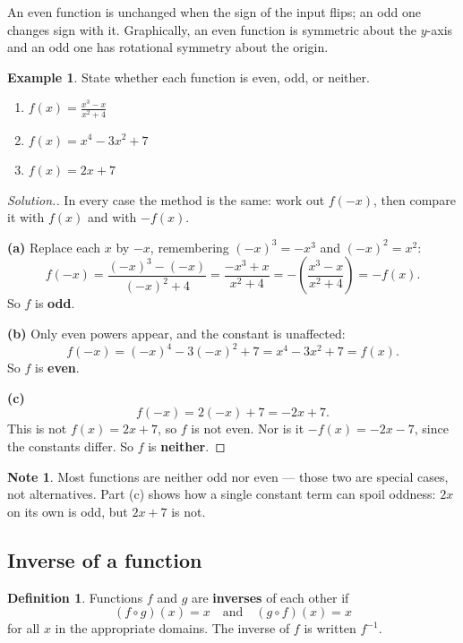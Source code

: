\documentclass[11pt,a4paper]{article}
\theoremstyle{definition}
\newtheorem{definition}[thm]{Definition}
\newtheorem{example}[thm]{Example}
\newtheorem{note}[thm]{Note}
\newenvironment{solution}
  {\renewcommand{\qedsymbol}{}\begin{proof}[\textit{Solution}.]}
  {\end{proof}}
\begin{document}
An even function is unchanged when the sign of the input flips; an odd one changes
sign with it. Graphically, an even function is symmetric about the $y$-axis and an odd
one has rotational symmetry about the origin.

\begin{example}
State whether each function is even, odd, or neither.
\begin{enumerate}
\item[(a).] $f(x)=\frac{x^3-x}{x^2+4}$
\item[(b).] $f(x)=x^4-3x^2+7$
\item[(c).] $f(x)=2x+7$
\end{enumerate}
\end{example}

\begin{solution}
In every case the method is the same: work out $f(-x)$, then compare it with $f(x)$ and
with $-f(x)$.

\textbf{(a)} Replace each $x$ by $-x$, remembering $(-x)^3=-x^3$ and $(-x)^2=x^2$:
$$f(-x)=\frac{(-x)^3-(-x)}{(-x)^2+4}=\frac{-x^3+x}{x^2+4}=-\left(\frac{x^3-x}{x^2+4}\right)=-f(x).$$
So $f$ is \textbf{odd}.

\textbf{(b)} Only even powers appear, and the constant is unaffected:
$$f(-x)=(-x)^4-3(-x)^2+7=x^4-3x^2+7=f(x).$$
So $f$ is \textbf{even}.

\textbf{(c)} $$f(-x)=2(-x)+7=-2x+7.$$
This is not $f(x)=2x+7$, so $f$ is not even. Nor is it $-f(x)=-2x-7$, since the
constants differ. So $f$ is \textbf{neither}.
\end{solution}

\begin{note}
Most functions are neither odd nor even --- those two are special cases, not
alternatives. Part (c) shows how a single constant term can spoil oddness: $2x$ on its
own is odd, but $2x+7$ is not.
\end{note}

\subsection{Inverse of a function}

\begin{definition}
Functions $f$ and $g$ are \textbf{inverses} of each other if
$$(f\circ g)(x)=x\quad\text{and}\quad (g\circ f)(x)=x$$
for all $x$ in the appropriate domains. The inverse of $f$ is written $f^{-1}$.
\end{definition}
\end{document}
